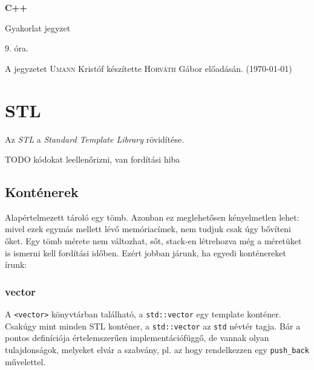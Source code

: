 \documentclass[a4paper,11.5pt]{article}
\begin{document}
	\setlength\parindent{0pt}
	\def\s{\hspace{0.2mm}\vphantom{\beta}}
	\def\Z{\mathbb{Z}}
	\def\Q{\mathbb{Q}}
	\def\R{\mathbb{R}}
	\def\C{\mathbb{C}}
	\def\N{\mathbb{N}}
	\def\Ra{\overline{\mathbb{R}}}
	
	\def\sume{\displaystyle\sum_{n=1}^{+\infty}}
	\def\sumn{\displaystyle\sum_{n=0}^{+\infty}}
	
	\def\narrow{\underset{n\rightarrow+\infty}{\longrightarrow}}
	\def\limn{\displaystyle\lim_{n\to +\infty}}
	\def\limx{\displaystyle\lim_{x\to +\infty}}
	
	\theoremstyle{definition}
	\newtheorem{theorem}{Tétel}[subsection] 
	
	\theoremstyle{definition}
	\newtheorem{definition}[theorem]{Definíció} 
	\newtheorem{example}[theorem]{Példa} 
	\newtheorem{task}[theorem]{Feladat} 
	\newtheorem{note}[theorem]{Megjegyzés}
	\begin{center}
		{\LARGE\textbf{C++}}
		
		{\Large Gyakorlat jegyzet}
		
		9. óra.
	\end{center}
	A jegyzetet \textsc{Umann} Kristóf készítette \textsc{Horváth} Gábor  előadásán. (\today)
	
	\section{STL}

	Az \textit{STL} a \textit{Standard Template Library} rövidítése.
	
	{\LARGE TODO kódokat leellenőrizni, van fordítási hiba}
	\subsection{Konténerek}
	Alapértelmezett tároló egy tömb. Azonban ez meglehetősen kényelmetlen lehet: mivel ezek egymás mellett lévő memóriacímek, nem tudjuk csak úgy bővíteni őket. Egy tömb mérete nem változhat, sőt, stack-en létrehozva még a méretüket is ismerni kell fordítási időben. Ezért jobban járunk, ha egyedi konténereket írunk:
	\subsubsection{vector}
	A \texttt{<vector>} könyvtárban található, a \texttt{std::vector} egy template konténer. Csakúgy mint minden STL konténer, a \texttt{std::vector} az \texttt{std} névtér tagja. Bár a pontos definíciója értelemszerűen implementációfüggő, de vannak olyan tulajdonságok, melyeket elvár a szabvány, pl. az hogy rendelkezzen egy \texttt{push\_back} művelettel.
	\smallskip
	
\end{document}
